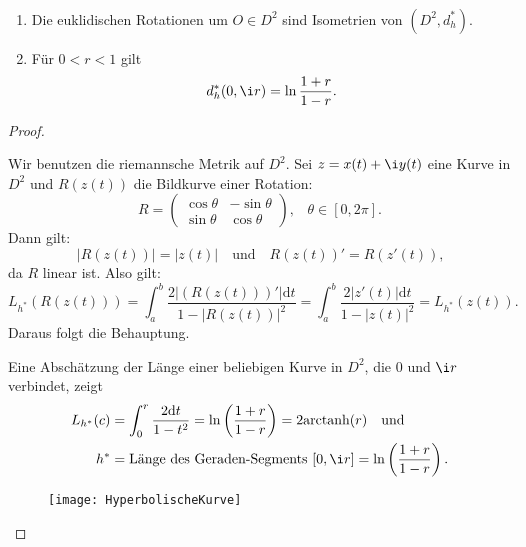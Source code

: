 \begin{theorem}
  \
  \begin{enumerate}
    \item Die euklidischen Rotationen um \( O \in D^2 \) sind Isometrien von \( (D^2, d_h^\ast) \).
    \item Für \( 0 < r < 1 \) gilt
    \begin{equation*}
      d_h^\ast(0,\i r) = \ln\frac{1+r}{1-r}\text{.}
    \end{equation*}
  \end{enumerate}
  \begin{proof}
    \
    \begin{enumerate}
      \item Wir benutzen die riemannsche Metrik auf \( D^2 \). Sei \( z = x(t) + \i y(t) \) eine Kurve in \( D^2 \) und \( R(z(t)) \) die Bildkurve einer Rotation:
      \begin{equation*}
        R = \begin{pmatrix}
          \cos \theta & - \sin \theta \\
          \sin \theta & \cos \theta
        \end{pmatrix}\text{,}\quad \theta \in [0,2\pi]\text{.}
      \end{equation*}
      Dann gilt:
      \begin{equation*}
        \left\vert R(z(t)) \right\vert = \left\vert z(t) \right\vert \quad \text{und} \quad R(z(t))' = R(z'(t))\text{,}
      \end{equation*}
      da \( R \) linear ist. Also gilt:
      \begin{equation*}
        L_{h^\ast}(R(z(t))) = \int_a^b \frac{2\left\vert (R(z(t)))' \right\vert\text{d}t}{1-\left\vert R(z(t)) \right\vert^2} = \int_a^b \frac{2\left\vert z'(t) \right\vert\text{d}t}{1-\left\vert z(t) \right\vert^2} = L_{h^\ast}(z(t))\text{.}
      \end{equation*}
      Daraus folgt die Behauptung.

      \begin{minipage}{.65\textwidth}
        \item Eine Abschätzung der Länge einer beliebigen Kurve in \( D^2 \), die \( 0 \) und \( \i r \) verbindet, zeigt
        \begin{align*}
          L_{h^\ast}(c) &= \int_0^r \frac{2\text{d}t}{1-t^2} = \ln\left( \frac{1+r}{1-r} \right) = 2\text{arctanh}(r) \quad \text{und} \\
          h^\ast &= \text{Länge des Geraden-Segments } [0,\i r] = \ln\left( \frac{1+r}{1-r} \right)\text{.}
        \end{align*}
      \end{minipage}
      \hfill
      \begin{minipage}{.325\textwidth}
        \begin{figure}[H]
          \texttt{[image: HyperbolischeKurve]}
        \end{figure}
      \end{minipage}
    
    \end{enumerate}
  \end{proof}
\end{theorem}

